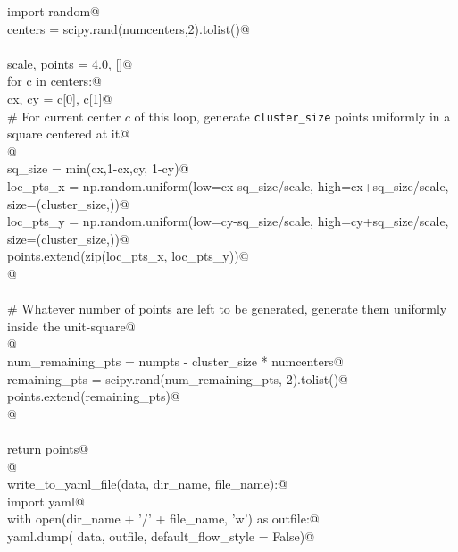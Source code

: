 \documentclass[12pt, english, oneside]{report}
\begin{document}
\begin{appendices}
\begin{flushleft}
\begin{list}{}{}
\mbox{}\verb@    import random@\\
\mbox{}\verb@    centers = scipy.rand(numcenters,2).tolist()@\\
\mbox{}\verb@@\\
\mbox{}\verb@    scale, points = 4.0, []@\\
\mbox{}\verb@    for c in centers:@\\
\mbox{}\verb@        cx, cy = c[0], c[1]@\\
\mbox{}\verb@        # For current center $c$ of this loop, generate \verb|cluster_size| points uniformly in a square centered at it@\\
\mbox{}\verb@           @\\
\mbox{}\verb@        sq_size      = min(cx,1-cx,cy, 1-cy)@\\
\mbox{}\verb@        loc_pts_x    = np.random.uniform(low=cx-sq_size/scale, high=cx+sq_size/scale, size=(cluster_size,))@\\
\mbox{}\verb@        loc_pts_y    = np.random.uniform(low=cy-sq_size/scale, high=cy+sq_size/scale, size=(cluster_size,))@\\
\mbox{}\verb@        points.extend(zip(loc_pts_x, loc_pts_y))@\\
\mbox{}\verb@        @\\
\mbox{}\verb@@\\
\mbox{}\verb@    # Whatever number of points are left to be generated, generate them uniformly inside the unit-square@\\
\mbox{}\verb@       @\\
\mbox{}\verb@    num_remaining_pts = numpts - cluster_size * numcenters@\\
\mbox{}\verb@    remaining_pts = scipy.rand(num_remaining_pts, 2).tolist()@\\
\mbox{}\verb@    points.extend(remaining_pts)@\\
\mbox{}\verb@    @\\
\mbox{}\verb@@\\
\mbox{}\verb@    return points@\\
\mbox{}\verb@    @\\
\mbox{}\verb@def write_to_yaml_file(data, dir_name, file_name):@\\
\mbox{}\verb@   import yaml@\\
\mbox{}\verb@   with open(dir_name + '/' + file_name, 'w') as outfile:@\\
\mbox{}\verb@     yaml.dump( data, outfile, default_flow_style = False)@\\
\mbox{}\verb@@{\NWsep}
\end{list}
\vspace{-1.5ex}
\footnotesize
\begin{list}{}{\setlength{\itemsep}{-\parsep}\setlength{\itemindent}{-\leftmargin}}


\end{list}
\end{flushleft}
\end{appendices}
\end{document}
